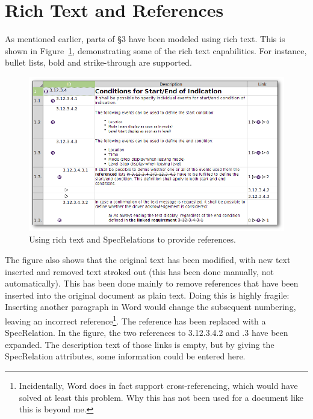 \documentclass{template/openetcs_report}
\begin{document}
\section{Rich Text and References}

As mentioned earlier, parts of §3 have been modeled using rich text.  This is shown in Figure~\ref{fig:xhtml-and-links}, demonstrating some of the rich text capabilities.  For instance, bullet lists, bold and strike-through are supported.

\begin{figure}
	\begin{center}
	\includegraphics[width=\textwidth]{img/xhtml-and-links.png}
	\end{center}
	\caption{Using rich text and SpecRelations to provide references.}
	\label{fig:xhtml-and-links}
\end{figure}

The figure also shows that the original text has been modified, with new text inserted and removed text stroked out (this has been done manually, not automatically).  This has been done mainly to remove references that have been inserted into the original document as plain text.  Doing this is highly fragile: Inserting another paragraph in Word would change the subsequent numbering, leaving an incorrect reference\footnote{Incidentally, Word does in fact support cross-referencing, which would have solved at least this problem.  Why this has not been used for a document like this is beyond me.}.  The reference has been replaced with a SpecRelation.  In the figure, the two references to 3.12.3.4.2 and .3 have been expanded.  The description text of those links is empty, but by giving the SpecRelation attributes, some information could be entered here.
\end{document}
